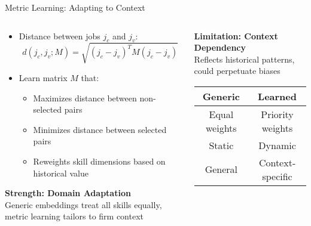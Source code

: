 \documentclass{beamer}
\begin{document}
\begin{frame}{Metric Learning: Adapting to Context}
\begin{columns}
\begin{column}{0.48\textwidth}
\begin{itemize}
    \item Distance between jobs $j_c$ and $j_v$:
    \begin{equation}
    d(j_c, j_v; M) = \sqrt{(j_c - j_v)^T M(j_c - j_v)}
    \end{equation}
    
    \item Learn matrix $M$ that:
    \begin{itemize}
        \item Maximizes distance between non-selected pairs
        \item Minimizes distance between selected pairs
        \item Reweights skill dimensions based on historical value
    \end{itemize}
\end{itemize}

\begin{tcolorbox}[colback=boxbackground,colframe=boxframe,sharp corners]
\textbf{Strength: Domain Adaptation}\\
Generic embeddings treat all skills equally, metric learning tailors to firm context
\end{tcolorbox}
\end{column}
\begin{column}{0.48\textwidth}
\begin{tcolorbox}[colback=boxbackground,colframe=boxframe,sharp corners]
\textbf{Limitation: Context Dependency}\\
Reflects historical patterns, could perpetuate biases
\end{tcolorbox}

\vspace{1cm}
\centering
\begin{tabular}{c|c}
\textbf{Generic} & \textbf{Learned} \\
\hline
Equal weights & Priority weights \\
Static & Dynamic \\
General & Context-specific \\
\end{tabular}
\end{column}
\end{columns}
\end{frame}
\end{document}
